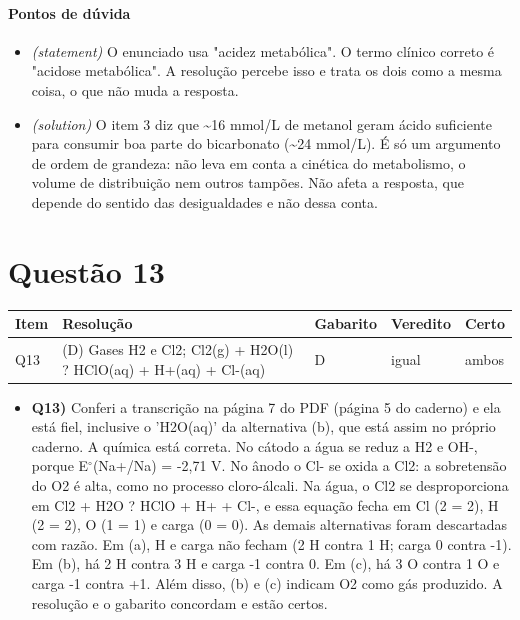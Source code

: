 \documentclass{article}%
\begin{document}
\paragraph{Pontos de dúvida}%
\begin{itemize}%
\item%
\textit{(statement)} O enunciado usa "acidez metabólica". O termo clínico correto é "acidose metabólica". A resolução percebe isso e trata os dois como a mesma coisa, o que não muda a resposta.%
\item%
\textit{(solution)} O item 3 diz que \textasciitilde{}16 mmol/L de metanol geram ácido suficiente para consumir boa parte do bicarbonato (\textasciitilde{}24 mmol/L). É só um argumento de ordem de grandeza: não leva em conta a cinética do metabolismo, o volume de distribuição nem outros tampões. Não afeta a resposta, que depende do sentido das desigualdades e não dessa conta.%
\end{itemize}%
\section*{Questão 13}%
\begin{longtable}{@{}p{} p{} p{} p{} p{}@{}}\toprule Item & Resolução & Gabarito & Veredito & Certo \\ \midrule
Q13 & (D) Gases H2 e Cl2; Cl2(g) + H2O(l) ? HClO(aq) + H+(aq) + Cl{-}(aq) & D & igual & ambos \\
\bottomrule\end{longtable}%
\begin{itemize}%
\item%
\textbf{Q13)} Conferi a transcrição na página 7 do PDF (página 5 do caderno) e ela está fiel, inclusive o 'H2O(aq)' da alternativa (b), que está assim no próprio caderno. A química está correta. No cátodo a água se reduz a H2 e OH{-}, porque E$^\circ$(Na+/Na) = -2,71 V. No ânodo o Cl{-} se oxida a Cl2: a sobretensão do O2 é alta, como no processo cloro{-}álcali. Na água, o Cl2 se desproporciona em Cl2 + H2O ? HClO + H+ + Cl{-}, e essa equação fecha em Cl (2 = 2), H (2 = 2), O (1 = 1) e carga (0 = 0). As demais alternativas foram descartadas com razão. Em (a), H e carga não fecham (2 H contra 1 H; carga 0 contra -1). Em (b), há 2 H contra 3 H e carga -1 contra 0. Em (c), há 3 O contra 1 O e carga -1 contra +1. Além disso, (b) e (c) indicam O2 como gás produzido. A resolução e o gabarito concordam e estão certos.%
\end{itemize}%
\end{document}
